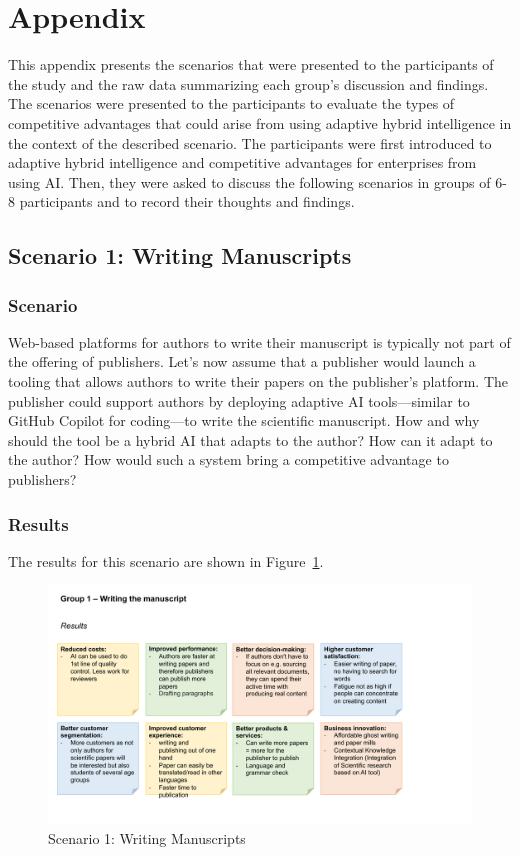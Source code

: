 \section{Appendix}
\label{appendix:scenarios}


This appendix presents the scenarios that were presented to the participants of the study and the raw data
summarizing each group's discussion and findings. The scenarios were presented to the participants to evaluate
the types of competitive advantages that could arise from using adaptive hybrid intelligence in the context
of the described scenario. The participants were first introduced to adaptive hybrid intelligence
and competitive advantages for enterprises from using AI. Then, they were asked to discuss the
following scenarios in groups of 6-8 participants and to record their thoughts and findings.


\subsection{Scenario 1: Writing Manuscripts}

\subsubsection*{Scenario}

Web-based platforms for authors to write their manuscript is typically not part of the offering of
publishers. Let's now assume that a publisher would launch a tooling that allows authors to write
their papers on the publisher's platform. The publisher could support authors by deploying adaptive
AI tools---similar to GitHub Copilot for coding---to write the scientific manuscript. How and why
should the tool be a hybrid AI that adapts to the author? How can it adapt to the author? How would
such a system bring a competitive advantage to publishers?

\subsubsection*{Results}

The results for this scenario are shown in Figure~\ref{fig:appendix:fig1}.

\begin{figure}[h!]
    \centering
    \caption{Scenario 1: Writing Manuscripts}
    \label{fig:appendix:fig1}
    \includegraphics[width=\textwidth]{figures/results_1.pdf}
\end{figure}


